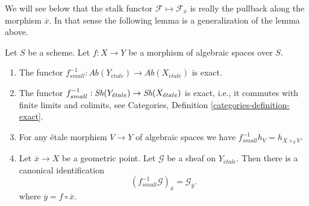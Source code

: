 \noindent
We will see below that the stalk functor
$\mathcal{F} \mapsto \mathcal{F}_{\overline{x}}$
is really the pullback along the morphism $\overline{x}$. In that sense
the following lemma is a generalization of the lemma above.

\begin{lemma}
\label{lemma-stalk-pullback}
Let $S$ be a scheme.
Let $f : X \to Y$ be a morphism of algebraic spaces over $S$.
\begin{enumerate}
\item The functor
$f_{small}^{-1} :
\textit{Ab}(Y_{\acute{e}tale})
\to
\textit{Ab}(X_{\acute{e}tale})$
is exact.
\item The functor
$f_{small}^{-1} :
\mathop{\textit{Sh}}\nolimits(Y_{\acute{e}tale})
\to
\mathop{\textit{Sh}}\nolimits(X_{\acute{e}tale})$
is exact, i.e., it commutes with finite limits and colimits, see
Categories, Definition \ref{categories-definition-exact}.
\item For any \'etale morphism $V \to Y$ of algebraic spaces
we have $f_{small}^{-1}h_V = h_{X \times_Y V}$.
\item Let $\overline{x} \to X$ be a geometric point.
Let $\mathcal{G}$ be a sheaf on $Y_{\acute{e}tale}$.
Then there is a canonical identification
$$
(f_{small}^{-1}\mathcal{G})_{\overline{x}} = \mathcal{G}_{\overline{y}}.
$$
where $\overline{y} = f \circ \overline{x}$.
\end{enumerate}
\end{lemma}

